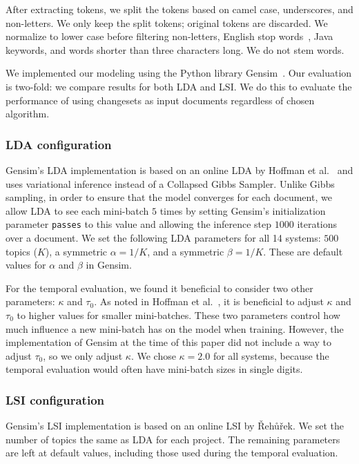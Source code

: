 After extracting tokens, we split the tokens based on camel case,
underscores, and non-letters.
We only keep the split tokens; original tokens are discarded.
We normalize to lower case before filtering non-letters, English stop words~\cite{StopWords}, Java keywords, and words shorter than three characters long.
We do not stem words.

We implemented our modeling using the Python library Gensim~\cite{Gensim}.
Our evaluation is two-fold: we compare results for both LDA and LSI.
We do this to evaluate the performance of using changesets as input
documents regardless of chosen algorithm.

\subsubsection{LDA configuration}

Gensim's LDA implementation is based on an online LDA by Hoffman et al.~\cite{Hoffman-etal:2010}
and uses variational inference instead of a Collapsed Gibbs Sampler.
Unlike Gibbs sampling, in order to ensure that the model converges for each document,
we allow LDA to see each mini-batch $5$ times by setting Gensim's initialization parameter \texttt{passes} to this value
and allowing the inference step $1000$ iterations over a document.
We set the following LDA parameters for all 14 systems:
$500$ topics ($K$), a symmetric $\alpha=1/K$, and a symmetric $\beta=1/K$.
These are default values for $\alpha$ and $\beta$ in Gensim.

For the temporal evaluation, we found it beneficial to consider two other parameters: $\kappa$ and $\tau_0$.
As noted in Hoffman et al.~\cite{Hoffman-etal:2010}, it is beneficial to
adjust $\kappa$ and $\tau_0$ to higher values for smaller mini-batches.
These two parameters control how much influence a new mini-batch has on the model when training.
However, the implementation of Gensim at the time of this paper did not
include a way to adjust $\tau_0$, so we only adjust $\kappa$.
We chose $\kappa=2.0$ for all systems, because the temporal evaluation
would often have mini-batch sizes in single digits.

\subsubsection{LSI configuration}

Gensim's LSI implementation is based on an online LSI by {\v R}eh{\r u}{\v r}ek\cite{Radim:2011}.
We set the number of topics the same as LDA for each project.
The remaining parameters are left at default values, including those used
during the temporal evaluation.


